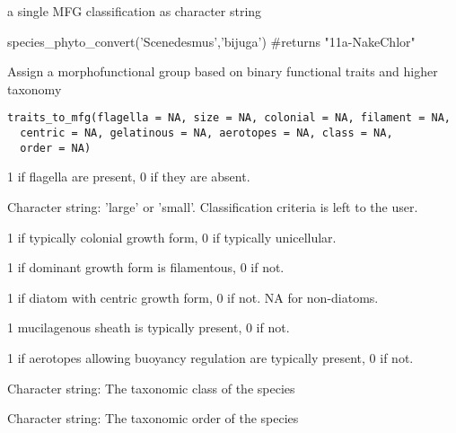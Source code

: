 \documentclass[a4paper]{book}
\begin{document}
%
\begin{Value}
a single MFG classification as character string
\end{Value}
%
\begin{Examples}
\begin{ExampleCode}
species_phyto_convert('Scenedesmus','bijuga')
#returns "11a-NakeChlor"
\end{ExampleCode}
\end{Examples}
%
\begin{Description}\relax
Assign a morphofunctional group based on binary functional traits and higher taxonomy
\end{Description}
%
\begin{Usage}
\begin{verbatim}
traits_to_mfg(flagella = NA, size = NA, colonial = NA, filament = NA,
  centric = NA, gelatinous = NA, aerotopes = NA, class = NA,
  order = NA)
\end{verbatim}
\end{Usage}
%
\begin{Arguments}
\begin{ldescription}
\item[\code{flagella}] 1 if flagella are present, 0 if they are absent.

\item[\code{size}] Character string: 'large' or 'small'. Classification criteria is left to the user.

\item[\code{colonial}] 1 if typically colonial growth form, 0 if typically unicellular.

\item[\code{filament}] 1 if dominant growth form is filamentous, 0 if not.

\item[\code{centric}] 1 if diatom with centric growth form, 0 if not. NA for  non-diatoms.

\item[\code{gelatinous}] 1 mucilagenous sheath is typically present, 0 if not.

\item[\code{aerotopes}] 1 if aerotopes allowing buoyancy regulation are typically present, 0 if not.

\item[\code{class}] Character string: The taxonomic class of the species

\item[\code{order}] Character string: The taxonomic order of the species
\end{ldescription}
\end{Arguments}
\end{document}
